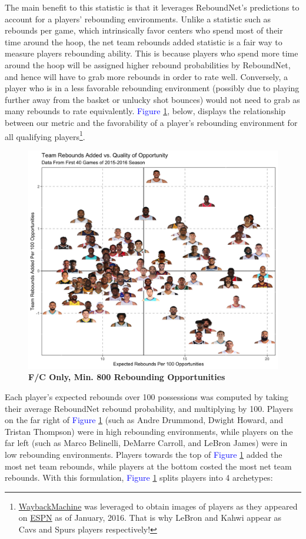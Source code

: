 \documentclass{article}
\begin{document}
\noindent
The main benefit to this statistic is that it leverages ReboundNet's predictions to account for a players' rebounding environments. Unlike a statistic such as rebounds per game, which intrinsically favor centers who spend most of their time around the hoop, the net team rebounds added statistic is a fair way to measure players rebounding ability. This is because players who spend more time around the hoop will be assigned higher rebound probabilities by ReboundNet, and hence will have to grab more rebounds in order to rate well. Conversely, a player who is in a less favorable rebounding environment (possibly due to playing further away from the basket or unlucky shot bounces) would not need to grab as many rebounds to rate equivalently. 
\bigbreak
\noindent
\textcolor{blue}{Figure} \ref{fig:PlayersPlot}, below, displays the relationship between our metric and the favorability of a player's rebounding environment for all qualifying players\footnote{\href{https://archive.org/web/}{WaybackMachine} was leveraged to obtain images of players as they appeared on \href{espn.com}{ESPN} as of January, 2016. That is why LeBron and Kahwi appear as Cavs and Spurs players respectively!}.

\begin{figure}[htb]
\centering
\includegraphics[width=.85\columnwidth]{PlayersPlot2.jpg}
\caption{\bf{F/C Only, Min. 800 Rebounding Opportunities}}
\label{fig:PlayersPlot}
\end{figure}

\noindent
Each player's expected rebounds over 100 possessions was computed by taking their average ReboundNet rebound probability, and multiplying by 100. Players on the far right of \textcolor{blue}{Figure} \ref{fig:PlayersPlot} (such as Andre Drummond, Dwight Howard, and Tristan Thompson) were in high rebounding environments, while players on the far left (such as Marco Belinelli, DeMarre Carroll, and LeBron James) were in low rebounding environments. Players towards the top of \textcolor{blue}{Figure} \ref{fig:PlayersPlot} added the most net team rebounds, while players at the bottom costed the most net team rebounds. With this formulation, \textcolor{blue}{Figure} \ref{fig:PlayersPlot} splits players into 4 archetypes: 
\end{document}
